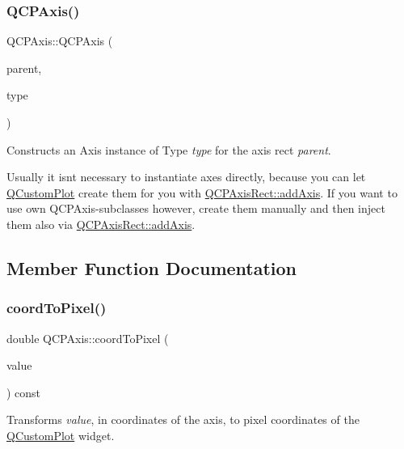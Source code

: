 \subsubsection{\texorpdfstring{Q\+C\+P\+Axis()}{QCPAxis()}}
{\footnotesize\ttfamily Q\+C\+P\+Axis\+::\+Q\+C\+P\+Axis (\begin{DoxyParamCaption}\item[{\mbox{\hyperlink{class_q_c_p_axis_rect}{Q\+C\+P\+Axis\+Rect}} $\ast$}]{parent,  }\item[{\mbox{\hyperlink{class_q_c_p_axis_ae2bcc1728b382f10f064612b368bc18a}{Axis\+Type}}}]{type }\end{DoxyParamCaption})\hspace{0.3cm}{\ttfamily [explicit]}}

Constructs an Axis instance of Type {\itshape type} for the axis rect {\itshape parent}.

Usually it isn\textquotesingle{}t necessary to instantiate axes directly, because you can let \mbox{\hyperlink{class_q_custom_plot}{Q\+Custom\+Plot}} create them for you with \mbox{\hyperlink{class_q_c_p_axis_rect_a2dc336092ccc57d44a46194c8a23e4f4}{Q\+C\+P\+Axis\+Rect\+::add\+Axis}}. If you want to use own Q\+C\+P\+Axis-\/subclasses however, create them manually and then inject them also via \mbox{\hyperlink{class_q_c_p_axis_rect_a2dc336092ccc57d44a46194c8a23e4f4}{Q\+C\+P\+Axis\+Rect\+::add\+Axis}}. 

\subsection{Member Function Documentation}
\mbox{\label{class_q_c_p_axis_af15d1b3a7f7e9b53d759d3ccff1fe4b4}} 
\subsubsection{\texorpdfstring{coord\+To\+Pixel()}{coordToPixel()}}
{\footnotesize\ttfamily double Q\+C\+P\+Axis\+::coord\+To\+Pixel (\begin{DoxyParamCaption}\item[{double}]{value }\end{DoxyParamCaption}) const}

Transforms {\itshape value}, in coordinates of the axis, to pixel coordinates of the \mbox{\hyperlink{class_q_custom_plot}{Q\+Custom\+Plot}} widget. \mbox{\label{class_q_c_p_axis_a22ab2d71d7341b9b3974c0dd10619af2}} 
